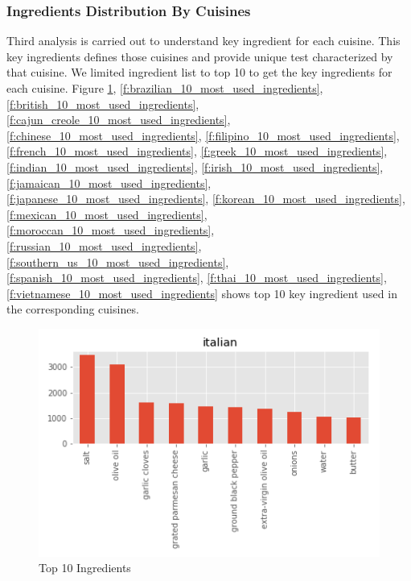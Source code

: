 \documentclass[sigconf]{acmart}
\begin{document}
\subsubsection{Ingredients Distribution By Cuisines}
Third analysis is carried out to understand key ingredient for each cuisine. This key ingredients defines those cuisines and provide unique test characterized by that cuisine. We limited ingredient list to top 10 to get the key ingredients for each cuisine. Figure \ref{f:italian_10_most_used_ingredients}, \ref{f:brazilian_10_most_used_ingredients}, \ref{f:british_10_most_used_ingredients}, \ref{f:cajun_creole_10_most_used_ingredients}, \ref{f:chinese_10_most_used_ingredients}, \ref{f:filipino_10_most_used_ingredients}, \ref{f:french_10_most_used_ingredients}, \ref{f:greek_10_most_used_ingredients}, \ref{f:indian_10_most_used_ingredients}, \ref{f:irish_10_most_used_ingredients}, \ref{f:jamaican_10_most_used_ingredients}, \ref{f:japanese_10_most_used_ingredients}, \ref{f:korean_10_most_used_ingredients}, \ref{f:mexican_10_most_used_ingredients}, \ref{f:moroccan_10_most_used_ingredients}, \ref{f:russian_10_most_used_ingredients}, \ref{f:southern_us_10_most_used_ingredients}, \ref{f:spanish_10_most_used_ingredients}, \ref{f:thai_10_most_used_ingredients}, \ref{f:vietnamese_10_most_used_ingredients}  shows top 10 key ingredient used in the corresponding cuisines. 
\begin{figure}[!ht]
  \centering\includegraphics[width=\columnwidth]{images/italian_10_most_used_ingredients.png}
  \caption{Top 10 Ingredients }\label{f:italian_10_most_used_ingredients}
\end{figure}
\end{document}
